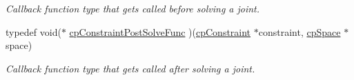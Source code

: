 \begin{DoxyCompactItemize}
\begin{DoxyCompactList}\small\item\em Callback function type that gets called before solving a joint. \end{DoxyCompactList}\item 
\hypertarget{group__cp_constraint_ga1adf3ccceb908229069aa2f10f21c1b1}{typedef void($\ast$ \hyperlink{group__cp_constraint_ga1adf3ccceb908229069aa2f10f21c1b1}{cp\-Constraint\-Post\-Solve\-Func} )(\hyperlink{structcp_constraint}{cp\-Constraint} $\ast$constraint, \hyperlink{structcp_space}{cp\-Space} $\ast$space)}\label{group__cp_constraint_ga1adf3ccceb908229069aa2f10f21c1b1}

\begin{DoxyCompactList}\small\item\em Callback function type that gets called after solving a joint. \end{DoxyCompactList}\end{DoxyCompactItemize}

